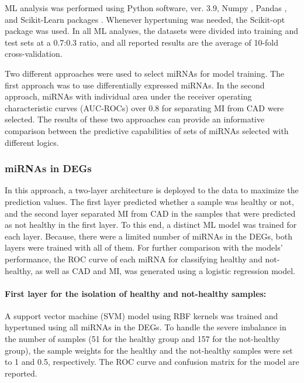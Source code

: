 \documentclass[sn-mathphys,Numbered]{sn-jnl}%
\theoremstyle{thmstyleone}%
\theoremstyle{thmstyletwo}%
\theoremstyle{thmstylethree}%
\begin{document}
ML analysis was performed using Python software, ver. 3.9, Numpy \cite{numpy}, Pandas \cite{Pandas}, and Scikit-Learn packages
\cite{scikit-learn}. Whenever hypertuning was needed, the Scikit-opt
package \cite{scikitopt} was used. In all ML analyses, the datasets
were divided into training and test sets at a 0.7:0.3 ratio, and all
reported results are the average of 10-fold cross-validation.

Two different approaches were used to select miRNAs for model training.
The first approach was to use differentially expressed miRNAs. In the
second approach, miRNAs with individual area under the receiver operating characteristic curves (AUC-ROCs) over 0.8 for separating MI from CAD were selected. The results of these two approaches can
provide an informative comparison between the predictive capabilities of
sets of miRNAs selected with different logics.


\subsubsection{miRNAs in DEGs}\label{mirnas-in-degs}

In this approach, a two-layer architecture is deployed to the data to
maximize the prediction values. The first layer predicted whether a
sample was healthy or not, and the second layer separated MI from CAD in
the samples that were predicted as not healthy in the first layer. To
this end, a distinct ML model was trained for each layer. Because, there
were a limited number of miRNAs in the DEGs, both layers were trained
with all of them. For further comparison with the models' performance,
the ROC curve of each miRNA for classifying healthy and not-healthy, as
well as CAD and MI, was generated using a logistic regression model.


\paragraph{First layer for the isolation of healthy and not-healthy
samples:}\label{first-layer-for-the-isolation-of-healthy-and-not-healthy-samples}

A support vector machine (SVM) model using RBF kernels was trained and
hypertuned using all miRNAs in the DEGs. To handle the severe imbalance
in the number of samples (51 for the healthy group and 157 for the
not-healthy group), the sample weights for the healthy and the
not-healthy samples were set to 1 and 0.5, respectively. The ROC curve
and confusion matrix for the model are reported.
\end{document}
